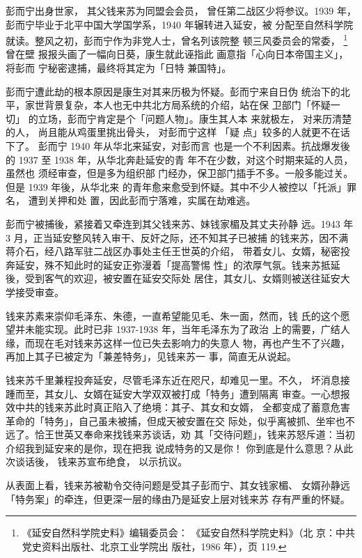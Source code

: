 彭而宁出身世家， 其父钱来苏为同盟会会员， 曾任第二战区少将参议。1939 年，
彭而宁毕业于北平中国大学国学系，1940 年辗转进入延安，被 分配至自然科学院
就读。整风之初，彭而宁作为非党人士，曾名列该院整 顿三风委员会的常委，
\footnote{《延安自然科学院史料》编辑委员会： 《延安自然科学院史料》（北
京：中共党史资料出版社、北京工业学院出 版社，1986 年），页 119.}曾在壁
报报头画了一幅向日葵，康生就此诬指此 画意指「心向日本帝国主义」，将彭而
宁秘密逮捕，最终将其定为「日特 兼国特」。

彭而宁遭此劫的根本原因是康生对其来历极为怀疑。彭而宁来自日伪 统治下的北
平，家世背景复杂，本人也无中共北方局系统的介绍，站在保 卫部门「怀疑一切」
的立场，彭而宁肯定是个「问题人物」。康生其人本 来就极左， 对来历清楚的人，
尚且能从鸡蛋里挑出骨头， 对彭而宁这样 「疑 点」较多的人就更不在话下了。
彭而宁 1940 年从华北来延安，对彭而言 也是一个不利因素。抗战爆发後的 1937
至 1938 年，从华北奔赴延安的青 年不在少数，对这个时期来延的人员，虽然也
须经审查，但是多为组织部 门经办，保卫部门插手不多。一般多能过关。但是
1939 年後，从华北来 的青年愈来愈受到怀疑。其中不少人被控以「托派」罪名，
遭到关押和处 置，因此彭而宁落难，实属在劫难逃。

彭而宁被捕後，紧接着又牵连到其父钱来苏、妹钱家楣及其丈夫孙静
远。1943 年 3 月，正当延安整风转入审干、反奸之际，还不知其子已被捕
的钱来苏，因不满蒋介石，经八路军驻二战区办事处主任王世英的介绍，
带着女儿、女婿，秘密投奔延安，殊不知此时的延安正弥漫着「提高警惕
性」的浓厚气氛。钱来苏抵延後，受到客气的欢迎，被安置在延安交际处
居住，其女儿、女婿则被送往延安大学接受审查。

钱来苏素来崇仰毛泽东、朱德，一直希望能见毛、朱一面，然而，钱
氏的这个愿望并未能实现。此时已非 1937-1938 年，当年毛泽东为了政治
上的需要，广结人缘，而现在毛对钱来苏这样一位已失去影响力的失意人
物，再也产生不了兴趣，再加上其子已被定为「兼差特务」，见钱来苏一
事，简直无从说起。

钱来苏千里兼程投奔延安，尽管毛泽东近在咫尺，却难见一里。不久，
坏消息接踵而至，其女儿、女婿在延安大学双双被打成「特务」遭到隔离
审查。一心想报效中共的钱来苏此时真正陷入了绝境：其子、其女和女婿，
全都变成了蓄意危害革命的「特务」，自己虽未被捕，但成天被安置在交
际处，似乎离被抓、坐牢也不远了。恰王世英又奉命来找钱来苏谈话，劝
其「交待问题」，钱来苏怒斥道：当初介绍我到延安来的是你，现在把我
说成特务的又是你！
你到底是什么意思？从此次谈话後，
钱来苏宣布绝食，
以示抗议。

从表面上看，钱来苏被勒令交待问题是受其子彭而宁、其女钱家楣、
女婿孙静远「特务案」的牵连，但更深一层的缘由乃是延安上层对钱来苏
存有严重的怀疑。

